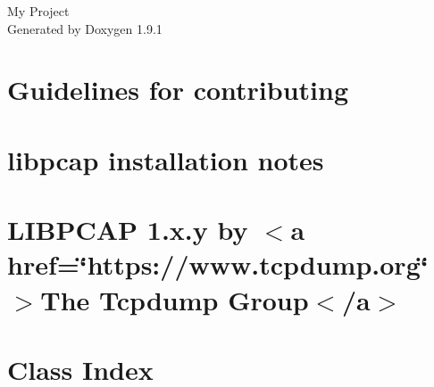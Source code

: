 \let\mypdfximage\pdfximage\def\pdfximage{\immediate\mypdfximage}\documentclass[twoside]{book}
\newcommand{\+}{\discretionary{\mbox{\scriptsize$\hookleftarrow$}}{}{}}
\newcommand{\clearemptydoublepage}{%
  \newpage{\pagestyle{empty}\cleardoublepage}%
}
\begin{document}
\raggedbottom

\hypersetup{pageanchor=false,
             bookmarksnumbered=true,
             pdfencoding=unicode
            }
\begin{titlepage}
\vspace*{7cm}
\begin{center}%
{\Large My Project }\\
\vspace*{1cm}
{\large Generated by Doxygen 1.9.1}\\
\end{center}
\end{titlepage}
\clearemptydoublepage
{}
\tableofcontents
\clearemptydoublepage
{}
\hypersetup{pageanchor=true}

\chapter{Guidelines for contributing}
\label{md_CONTRIBUTING}

\chapter{libpcap installation notes}
\label{md_INSTALL}

\chapter{LIBPCAP 1.x.\+y by $<$a href=\char`\"{}https\+://www.\+tcpdump.\+org\char`\"{}$>$The Tcpdump Group$<$/a$>$}
\label{md_README}

\chapter{Class Index}

\end{document}

